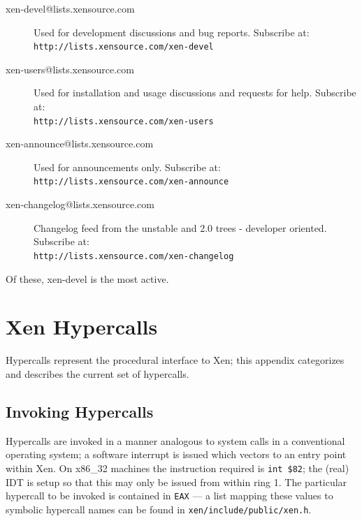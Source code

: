 \documentclass[11pt,twoside,final,openright]{report}
\begin{document}
\begin{description}
\item[xen-devel@lists.xensource.com] Used for development
discussions and bug reports.  Subscribe at: \\
{\small {\tt http://lists.xensource.com/xen-devel}}
\item[xen-users@lists.xensource.com] Used for installation and usage
discussions and requests for help.  Subscribe at: \\
{\small {\tt http://lists.xensource.com/xen-users}}
\item[xen-announce@lists.xensource.com] Used for announcements only.
Subscribe at: \\
{\small {\tt http://lists.xensource.com/xen-announce}}
\item[xen-changelog@lists.xensource.com]  Changelog feed
from the unstable and 2.0 trees - developer oriented.  Subscribe at: \\
{\small {\tt http://lists.xensource.com/xen-changelog}}
\end{description}

Of these, xen-devel is the most active.




\appendix






\newcommand{\hypercall}[1]{\vspace{2mm}{\sf #1}}






\chapter{Xen Hypercalls}
\label{a:hypercalls}

Hypercalls represent the procedural interface to Xen; this appendix 
categorizes and describes the current set of hypercalls. 

\section{Invoking Hypercalls} 

Hypercalls are invoked in a manner analogous to system calls in a
conventional operating system; a software interrupt is issued which
vectors to an entry point within Xen. On x86\_32 machines the
instruction required is {\tt int \$82}; the (real) IDT is setup so
that this may only be issued from within ring 1. The particular 
hypercall to be invoked is contained in {\tt EAX} --- a list 
mapping these values to symbolic hypercall names can be found 
in {\tt xen/include/public/xen.h}. 
\end{document}

